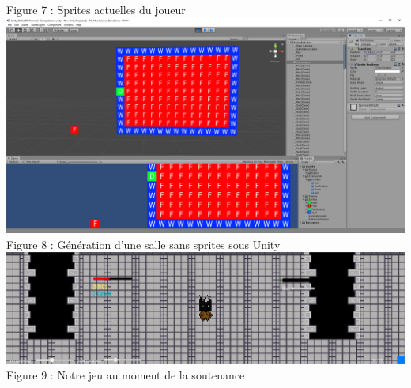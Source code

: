 \documentclass[]{extarticle}
\begin{document}
\begin{center}
\smallbreak
Figure 7 : Sprites actuelles du joueur
\bigbreak
\bigbreak
\includegraphics[scale = 0.23]{generation.PNG}
\smallbreak
Figure 8 : Génération d'une salle sans sprites sous Unity
\bigbreak
\bigbreak
\includegraphics[scale = 0.35]{affichagejeu.PNG}
\smallbreak
Figure 9 : Notre jeu au moment de la soutenance

\end{center}
\end{document}
